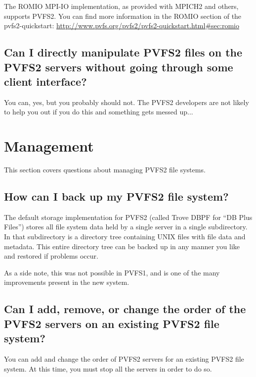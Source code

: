 \documentclass[11pt,letterpaper]{article}
\begin{document}
The ROMIO MPI-IO implementation, as provided with MPICH2 and others, supports
PVFS2.  You can find more information in the ROMIO section of the
pvfs2-quickstart: \url{http://www.pvfs.org/pvfs2/pvfs2-quickstart.html\#sec:romio}

\subsection{Can I directly manipulate PVFS2 files on the PVFS2 servers
            without going through some client interface?}

You can, yes, but you probably should not.  The PVFS2 developers are not
likely to help you out if you do this and something gets messed up...

%
%
\section{Management}

This section covers questions about managing PVFS2 file systems.

\subsection{How can I back up my PVFS2 file system?}

The default storage implementation for PVFS2 (called Trove DBPF for ``DB Plus
Files'') stores all file system data held by a single server in a single
subdirectory.  In that subdirectory is a directory tree containing UNIX files
with file data and metadata.
%
This entire directory tree can be backed up in any manner you like and
restored if problems occur.

As a side note, this was not possible in PVFS1, and is one of the many
improvements present in the new system.

\subsection{Can I add, remove, or change the order of the PVFS2 servers
            on an existing PVFS2 file system?}

You can add and change the order of PVFS2 servers for an existing PVFS2 file
system.  At this time, you must stop all the servers in order to do so.
\end{document}
